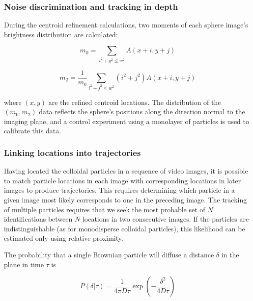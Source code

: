 \subsubsection{Noise discrimination and tracking in depth}

During the centroid refinement calculations, two moments of each sphere image's brightness 
distribution are calculated:

\begin{center}\begin{equation}
m_0 = \sum_{i^2+y^2 \leq w^2} A(x+i,y+j)
\end{equation}\end{center}

\begin{center}\begin{equation}m_2 = \frac{1}{m_0} \sum_{i^2+j^2 \leq w^2} (i^2 + j^2)A(x+i,y+j)
\end{equation}\end{center}

where $(x,y)$ are the refined centroid locations.  The distribution of the $(m_0,m_2)$ data reflects the
sphere's positions along the direction normal to the imaging plane, and a control experiment using a 
monolayer of particles is used to calibrate this data.

\subsubsection{Linking locations into trajectories}
\label{sec:time-tracking}

Having located the colloidal particles in a sequence of video images, it is possible to 
match particle locations in each image with corresponding locations in later images to produce
trajectories.  This requires determining which particle in a given image
most likely corresponds to one in the preceding image.  The tracking of 
multiple particles requires that we seek the most probable set of $N$ identifications 
between $N$ locations in two consecutive images. If the particles are indistinguishable (as for
monodisperse colloidal particles), this likelihood can be estimated only using relative
proximity.

The probability that a single Brownian particle will diffuse a distance $\delta$ in the plane 
in time $\tau$ is

\begin{center}\begin{equation}P(\delta|\tau) = \frac{1}{4\pi D\tau} \exp{ \left( -\frac{\delta^2}{4D\tau} \right) }
\end{equation}\end{center}

